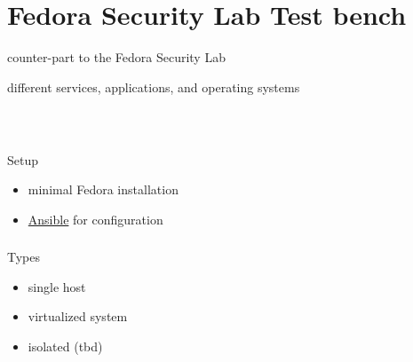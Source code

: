 \section{Fedora Security Lab Test bench}
%
\begin{frame}
counter-part to the Fedora Security Lab
\end{frame}
%
\begin{frame}
different services, applications, and operating systems
\end{frame}
%
\begin{frame}
\frametitle{\\}
%
{\LARGE Setup \newline}
\begin{itemize}
  \item minimal Fedora installation
  \item \href{http://www.ansibleworks.com/}{Ansible} for configuration
\end{itemize}
\end{frame}
%
\begin{frame}
\frametitle{}
%
{\LARGE Types \newline}
\begin{itemize}
  \item single host
  \item virtualized system
  \item isolated (tbd)
\end{itemize}
\end{frame}
%
